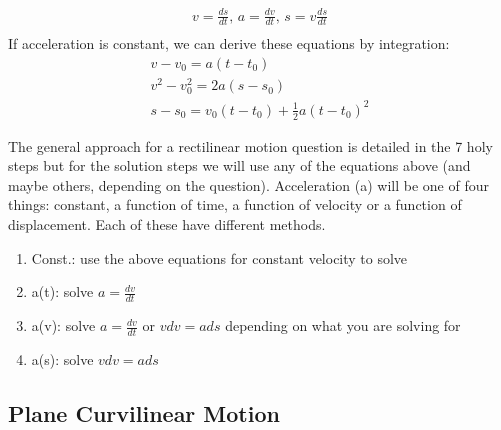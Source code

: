 \documentclass[a4paper, 12pt]{article}
\begin{document}
\begin{align*}
    v = \frac{ds}{dt} \text{, }
    a = \frac{dv}{dt} \text{, }
    s = v\frac{ds}{dt}\\
\end{align*}
If acceleration is constant, we can derive these equations by integration:
\begin{align}
    v - v_0 = a(t-t_0) \\ 
    v^2 - v_0^2 = 2a(s-s_0) \\ 
    s - s_0 = v_0(t-t_0) + \frac{1}{2}a(t-t_0)^2
\end{align}

The general approach for a rectilinear motion question is detailed in the 7 holy steps but for the solution
steps we will use any of the equations above (and maybe others, depending on the question). Acceleration (a) will 
be one of four things: constant, a function of time, a function of velocity or a function of displacement. Each
of these have different methods.

\begin{enumerate}
    \item Const.: use the above equations for constant velocity to solve 
    \item a(t): solve $a = \frac{dv}{dt}$
    \item a(v): solve $a = \frac{dv}{dt}$ or $vdv = ads$ depending on what you are solving for
    \item a(s): solve $vdv = ads$ 
\end{enumerate}

\begin{center}
\subsection*{Plane Curvilinear Motion}
\end{center}
\end{document}
